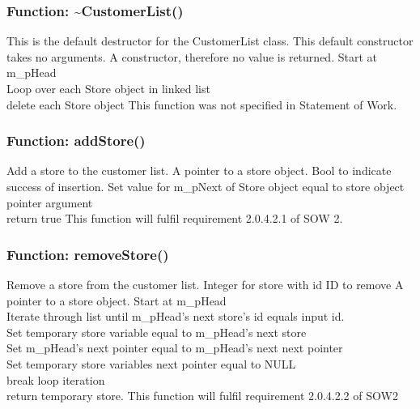 \documentclass[12pt]{article}%
\newcounter{subsubsubsection}[subsubsection]
\begin{document}
\subsubsection{Function: \textasciitilde CustomerList()}
This is the default destructor for the CustomerList class.
This default constructor takes no arguments.
A constructor, therefore no value is returned.
Start at m_pHead \\
Loop over each Store object in linked list \\
delete each Store object
This function was not specified in Statement of Work.

\subsubsection{Function: addStore()}
Add a store to the customer list.
A pointer to a store object.
Bool to indicate success of insertion.
Set value for m_pNext of Store object equal to store object pointer argument \\
return true
This function will fulfil requirement 2.0.4.2.1 of SOW 2.

\subsubsection{Function: removeStore()}
Remove a store from the customer list.
Integer for store with id ID to remove
A pointer to a store object.
Start at m_pHead \\
Iterate through list until m_pHead's next store's id equals input id. \\
Set temporary store variable equal to m_pHead's next store \\
Set m_pHead's next pointer equal to m_pHead's next next pointer\\
Set temporary store variables next pointer equal to NULL\\
break loop iteration \\
return temporary store.
This function will fulfil requirement 2.0.4.2.2 of SOW2
\end{document}
